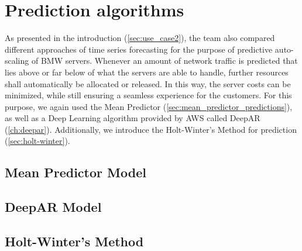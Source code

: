  \section{Prediction algorithms}
 \label{sec:prediction_intro}
 As presented in the introduction (\ref{sec:use_case2}), the team also compared different approaches of time series forecasting for the purpose of predictive auto-scaling of BMW servers. Whenever an amount of network traffic is predicted that lies above or far below of what the servers are able to handle, further resources shall automatically be allocated or released. In this way, the server costs can be minimized, while still ensuring a seamless experience for the customers. For this purpose, we again used the Mean Predictor (\ref{sec:mean_predictor_predictions}), as well as a Deep Learning algorithm provided by AWS called DeepAR (\ref{ch:deepar}). Additionally, we introduce the Holt-Winter's Method for prediction (\ref{sec:holt-winter}).
    
    \subsection{Mean Predictor Model}
       
    \subsection{DeepAR Model}
        
    \subsection{Holt-Winter's Method}
        
